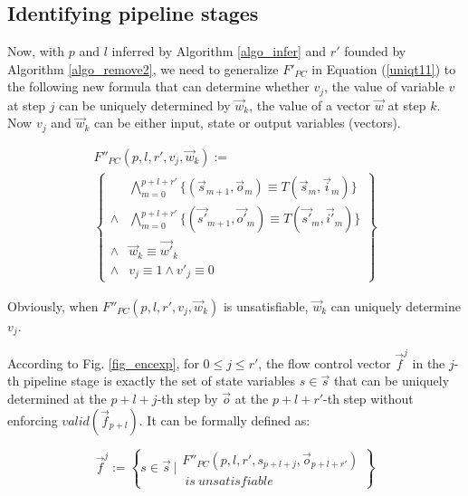 \documentclass[conference]{IEEEtran}
\begin{document}



\subsection{Identifying pipeline stages}\label{subsec_inferstage}

Now,
with $p$ and $l$ inferred by Algorithm \ref{algo_infer} and $r'$ founded by Algorithm \ref{algo_remove2},
we need to generalize $F'_{PC}$ in Equation (\ref{uniqt11}) to the following new formula that
can determine whether $v_j$,
the value of variable $v$ at step $j$
can be uniquely determined by $\vec{w}_k$,
the value of a vector $\vec{w}$ at step $k$.
Now $v_j$ and $\vec{w}_k$ can be either input, state or output variables (vectors).

\begin{multline}\label{uniqt2}
F''_{PC}(p,l,r',v_j,\vec{w}_k):=\\
\left\{
\begin{array}{cc}
&\bigwedge_{m=0}^{p+l+r'}
\{
(\vec{s}_{m+1},\vec{o}_m)\equiv T(\vec{s}_m,\vec{i}_m)
\}
\\
\wedge&\bigwedge_{m=0}^{p+l+r'}
\{
(\vec{s'}_{m+1},\vec{o'}_m)\equiv T(\vec{s'}_m,\vec{i'}_m)
\}
\\
\wedge&\vec{w}_{k}\equiv \vec{w'}_{k} \\
\wedge& v_{j}\equiv 1 \wedge  v'_{j}\equiv 0 
\end{array}
\right\}
\end{multline}

Obviously,
when $F''_{PC}(p,l,r',v_j,\vec{w}_k)$ is unsatisfiable,
$\vec{w}_k$ can uniquely determine $v_j$.

According to Fig. \ref{fig_encexp},
for $0\le j\le r'$,
the flow control vector $\vec{f}^j$ in the $j$-th pipeline stage
is exactly the set of state variables $s\in \vec{s}$ 
that can be uniquely determined at the $p+l+j$-th step by $\vec{o}$ 
at the $p+l+r'$-th step without enforcing $valid(\vec{f}_{p+l})$.
It can be formally defined as:

\begin{equation}\label{stgn_fj}
\vec{f}^{j} := 
 \left\{
 s\in \vec{s} ~| 
\begin{array}{cc}
 F''_{PC}(p,l,r',s_{p+l+j},\vec{o}_{p+l+r'})\\
 ~is~unsatisfiable
\end{array}
\right\}
\end{equation}
\end{document}
